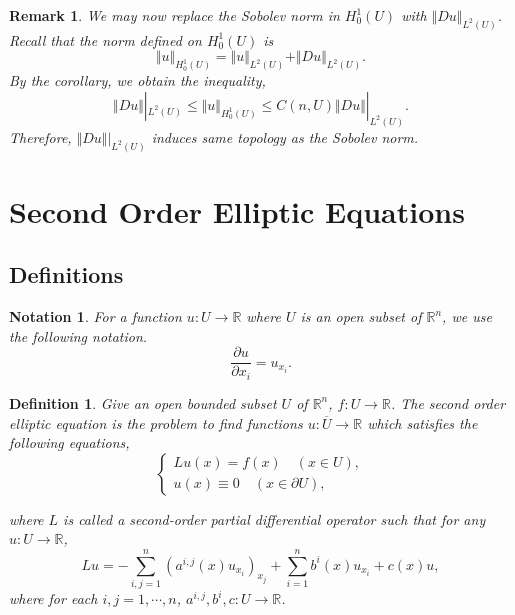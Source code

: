 \documentclass{article}
\newtheorem{definition}{Definition}[section]
\newtheorem{notation}{Notation}[section]
\newtheorem{remark}{Remark}[section]
\numberwithin{equation}{section}
\begin{document}
\begin{remark}
We may now replace the Sobolev norm in $H^1_0(U)$ with $\Vert Du\Vert_{L^2(U)}$. Recall that the norm defined on $H^1_0(U)$ is 
\begin{equation*}
\Vert u\Vert_{H^1_0(U)} = \Vert u\Vert_{L^2(U)}+\Vert Du\Vert_{L^2(U)}.
\end{equation*}
By the corollary, we obtain the inequality,
\begin{equation*}
\Vert Du\Vert|_{L^2(U)}\leq\Vert u\Vert_{H^1_0(U)} \leq C(n,U)\Vert Du\Vert|_{L^2(U)}.
\end{equation*}
Therefore, $\Vert Du\Vert|_{L^2(U)}$ induces same topology as the Sobolev norm.
\end{remark}

\section{Second Order Elliptic Equations}

\subsection{Definitions}

\begin{notation}
For a function $u:U\to\mathbb{R}$ where $U$ is an open subset of $\mathbb{R}^n$, we use the following notation.
\begin{equation*}
{\frac {\partial u} {\partial x_i}} = u_{x_i}.
\end{equation*}
\end{notation}

\begin{definition}
Give an open bounded subset $U$ of $\mathbb{R}^n$, $f:U\to\mathbb{R}$. The second order elliptic equation is the problem to find functions $u:\overline{U}\to\mathbb{R}$ which satisfies the following equations,
\begin{equation*}
\begin{cases}
Lu(x)=f(x)\quad (x\in U),\\
u(x)\equiv 0 \quad(x\in\partial U),
\end{cases}
\end{equation*}

where $L$ is called a second-order partial differential operator such that for any $u:U\to\mathbb{R}$, 
\begin{equation}
\label{eq:2.1}
Lu = -\sum_{i,j=1}^n (a^{i,j}(x)u_{x_i})_{x_j}+\sum_{i=1}^nb^i(x)u_{x_i}+c(x)u,
\end{equation}
where for each $i,j=1,\cdots,n$, $a^{i,j},b^i,c:U\to\mathbb{R}$. 
\end{definition}
\end{document}
